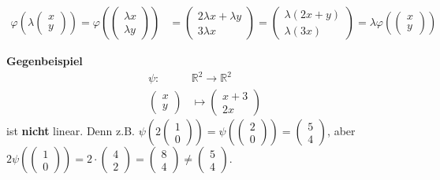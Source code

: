 \begin{description}
{\begin{align*}
		\varphi\left(\lambda\begin{pmatrix}x\\y\end{pmatrix}\right) = \varphi\left(\begin{pmatrix}\lambda x\\\lambda y\end{pmatrix}\right) &= \begin{pmatrix}2\lambda x + \lambda y\\3\lambda x\end{pmatrix} = \begin{pmatrix}\lambda(2x+y)\\\lambda(3x)\end{pmatrix} = \lambda \varphi\left(\begin{pmatrix}x\\y\end{pmatrix}\right)
	\end{align*}
	}
\end{description}

\textbf{Gegenbeispiel}
\begin{align*}
	\psi :\,\,&\mathbb{R}^2 \rightarrow \mathbb{R}^2 \\
	\begin{pmatrix}x\\y\end{pmatrix} &\mapsto \begin{pmatrix}x+3\\2x\end{pmatrix}
\end{align*}
ist \textbf{nicht} linear. Denn z.B. $\psi\left(2\begin{pmatrix}1\\0\end{pmatrix}\right) = \psi\left(\begin{pmatrix}2\\0\end{pmatrix}\right) = \begin{pmatrix}5\\4\end{pmatrix}$, aber $2\psi\left(\begin{pmatrix}1\\0\end{pmatrix}\right) = 2 \cdot \begin{pmatrix}4\\2\end{pmatrix} = \begin{pmatrix}8\\4\end{pmatrix} \neq \begin{pmatrix}5\\4\end{pmatrix}$.

